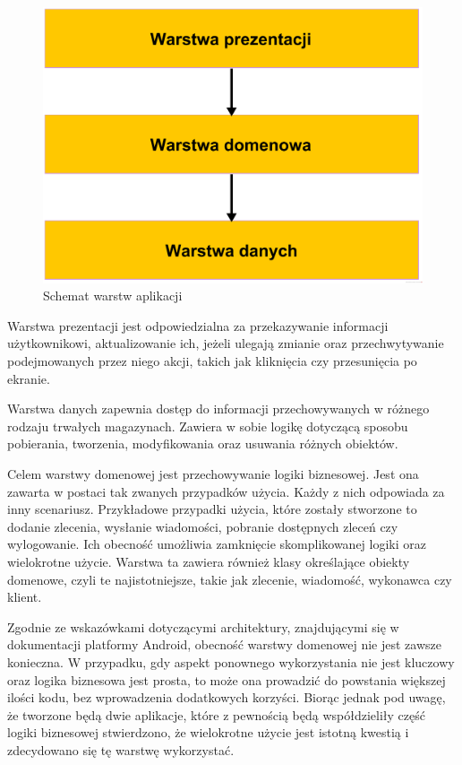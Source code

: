 \begin{figure}[ht]
  \centering
  \includegraphics[width=0.8\linewidth]{images/arch_layers.png}
  \caption{Schemat warstw aplikacji}
  \label{fig:ca-warstwy}
\end{figure}

Warstwa prezentacji jest odpowiedzialna za przekazywanie informacji użytkownikowi, aktualizowanie ich, jeżeli ulegają zmianie oraz przechwytywanie podejmowanych przez niego akcji, takich jak kliknięcia czy przesunięcia po ekranie.

Warstwa danych zapewnia dostęp do informacji przechowywanych w różnego rodzaju trwałych magazynach. Zawiera w sobie logikę dotyczącą sposobu pobierania, tworzenia, modyfikowania oraz usuwania różnych obiektów.

Celem warstwy domenowej jest przechowywanie logiki biznesowej. Jest ona zawarta w postaci tak zwanych przypadków użycia. Każdy z nich odpowiada za inny scenariusz. Przykładowe przypadki użycia, które zostały stworzone to dodanie zlecenia, wysłanie wiadomości, pobranie dostępnych zleceń czy wylogowanie. Ich obecność umożliwia zamknięcie skomplikowanej logiki oraz wielokrotne użycie. Warstwa ta zawiera również klasy określające obiekty domenowe, czyli te najistotniejsze, takie jak zlecenie, wiadomość, wykonawca czy klient.

Zgodnie ze wskazówkami dotyczącymi architektury, znajdującymi się w dokumentacji platformy Android, obecność warstwy domenowej nie jest zawsze konieczna. W przypadku, gdy aspekt ponownego wykorzystania nie jest kluczowy oraz logika biznesowa jest prosta, to może ona prowadzić do powstania większej ilości kodu, bez wprowadzenia dodatkowych korzyści. Biorąc jednak pod uwagę, że tworzone będą dwie aplikacje, które z pewnością będą współdzieliły część logiki biznesowej stwierdzono, że wielokrotne użycie jest istotną kwestią i zdecydowano się tę warstwę wykorzystać.

